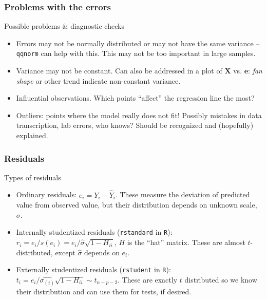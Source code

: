 \documentclass[handout]{beamer}
\begin{document}
   \begin{frame} \frametitle{Problems with the errors}

   \begin{block}
   {Possible problems \& diagnostic checks}
   \begin{itemize}[<+->]

   \item
   Errors may not be normally distributed or may not have  the same
   variance -- {\tt qqnorm} can help with this. This may not
   be too important in large samples.

   \item Variance may not be constant. Can also be addressed in a plot of
   $\pmb{X}$ vs. $\pmb{e}$: {\em fan shape} or other trend indicate
   non-constant variance.


   \item Influential observations. Which points ``affect'' the regression line the most?

   \item Outliers: points where the model really does not fit! Possibly mistakes in data transcription, lab errors, who knows? Should be recognized and (hopefully) explained.

   \end{itemize}
   \end{block}
   \end{frame}


   \begin{frame} \frametitle{Residuals}

   \begin{block}
   {Types of residuals}
   \begin{itemize}[<+->]
   \item Ordinary residuals: $e_i = Y_i - \widehat{Y}_i$. These measure the deviation of predicted value from observed value, but their distribution depends on unknown scale, $\sigma$.
   \item Internally studentized residuals ({\tt rstandard} in {\tt R}): $r_i = e_i / s(e_i) = e_i / \widehat{\sigma} \sqrt{1 - H_{ii}}$, $H$ is the ``hat'' matrix. These are almost $t$-distributed, except $\widehat{\sigma}$ depends on $e_i$.
   \item Externally studentized residuals ({\tt rstudent} in {\tt R}): $t_i = e_i / \widehat{\sigma_{(i)}} \sqrt{1 - H_{ii}} \sim t_{n-p-2}.$ These are
   exactly $t$ distributed so we know their distribution and can use them for tests, if desired.
   \end{itemize}
   \end{block}
   \end{frame}
\end{document}
